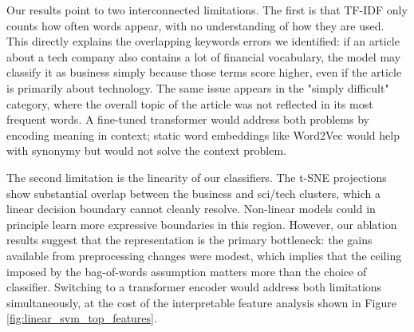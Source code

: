Our results point to two interconnected limitations. The first is that TF-IDF only counts how often words appear, with no understanding of how they are used. This directly explains the overlapping keywords errors we identified: if an article about a tech company also contains a lot of financial vocabulary, the model may classify it as business simply because those terms score higher, even if the article is primarily about technology. The same issue appears in the "simply difficult" category, where the overall topic of the article was not reflected in its most frequent words. A fine-tuned transformer would address both problems by encoding meaning in context; static word embeddings like Word2Vec would help with synonymy but would not solve the context problem.

The second limitation is the linearity of our classifiers. The t-SNE projections show substantial overlap between the business and sci/tech clusters, which a linear decision boundary cannot cleanly resolve. Non-linear models could in principle learn more expressive boundaries in this region. However, our ablation results suggest that the representation is the primary bottleneck: the gains available from preprocessing changes were modest, which implies that the ceiling imposed by the bag-of-words assumption matters more than the choice of classifier. Switching to a transformer encoder would address both limitations simultaneously, at the cost of the interpretable feature analysis shown in Figure \ref{fig:linear_svm_top_features}.